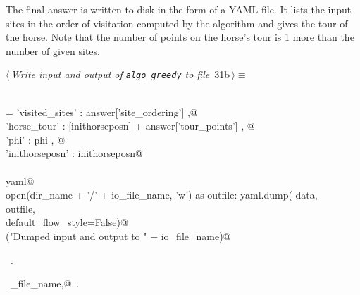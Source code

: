 \documentclass[11.5pt]{report}
\begin{document}
\vspace{-0.8cm}\newchunk The final answer is written to disk in the form of a YAML file. It lists the input sites 
in the order of visitation computed by the algorithm and gives the tour of the horse. 
Note that the number of points on the horse's tour is 1 more than the number of given sites. 
\begin{flushleft} \small\label{scrap40}\raggedright\small
{} $\langle\,${\itshape Write input and output of \verb|algo_greedy| to file}\nobreak\ {\footnotesize {31b}}$\,\rangle\equiv$
\vspace{-1ex}
\begin{list}{}{} \item
\mbox{}\verb@@\\
\mbox{}\verb@data = {'visited_sites'  : answer['site_ordering'] ,@\\
\mbox{}\verb@        'horse_tour'     : [inithorseposn] + answer['tour_points']   , @\\
\mbox{}\verb@        'phi'            : phi                     , @\\
\mbox{}\verb@        'inithorseposn'  : inithorseposn}@\\
\mbox{}\verb@@\\
\mbox{}\verb@import yaml@\\
\mbox{}\verb@with open(dir_name + '/' + io_file_name, 'w') as outfile:     yaml.dump( data, \@\\
\mbox{}\verb@                outfile, \@\\
\mbox{}\verb@                default_flow_style=False)@\\
\mbox{}\verb@debug("Dumped input and output to " + io_file_name)@\\
\mbox{}\verb@@{\NWsep}
\end{list}
\vspace{-1.5ex}
\footnotesize
\begin{list}{}{\setlength{\itemsep}{-\parsep}\setlength{\itemindent}{-\leftmargin}}
\item \NWtxtMacroRefIn\ .
\item \NWtxtIdentsUsed\nobreak\  \verb@io_file_name,@\nobreak\ .
\item{}
\end{list}
\vspace{4ex}
\end{flushleft}
\end{document}
